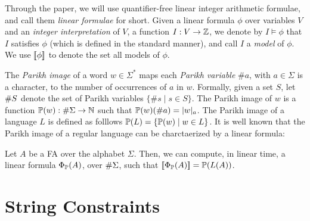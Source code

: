 \documentclass[sigplan,review,anonymous]{acmart}\settopmatter{printfolios=true,printccs=false,printacmref=false}
\begin{document}
Through the paper, we will use quantifier-free linear integer arithmetic formulae, and call them \emph{linear formulae} for short.  
Given a linear formula $\phi$ over variables $V$ and an \emph{integer interpretation} of $V$, a function $I:V\rightarrow \mathbb{Z}$, 
we denote by $I\models \phi$ that $I$ satisfies $\phi$ (which is defined in the standard manner), and call $I$ a \emph{model} of $\phi$. 
We use $[\![\phi]\!]$ to denote the set all models of $\phi$.%


The \emph{Parikh image} of a word $w\in \Sigma^*$ maps each \emph{Parikh variable} $\#a$, with $a \in \Sigma$ is a character, to the number of occurrences of $a$ in $w$.
Formally, given a set $S$, let $\#{S}$ denote the set of Parikh variables $\{\#s \mid s\in S\}$. 
The Parikh image of $w$ is a function $\mathbb{P}{(w)}:\#{\Sigma} \rightarrow \mathbb{N}$ such that $\mathbb{P}{(w)} (\#a) = |w|_a$. 
The Parikh image of a language $L$ is defined as folllows $\mathbb{P}{(L)} = \{\mathbb{P}{(w)} \mid w \in L\}$. %
%
It is well known that the Parikh image of a regular language  can be  charctaerized by a linear formula:



\begin{lemma}
Let $A$ be a FA over the alphabet $\Sigma$. Then, we can compute, in linear time,  a linear formula $\Phi_{\mathbb{P}}(A)$, over $\#{\Sigma}$, such that $[\![\Phi_{\mathbb{P}}(A)]\!] = \mathbb{P}{(L(A))}$.

\end{lemma}



 


\section{String Constraints} \label{section:sc}
\end{document}
